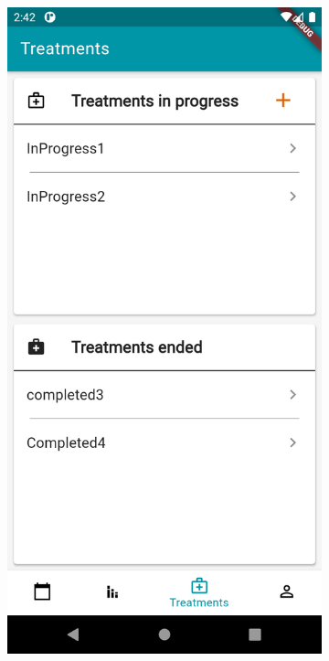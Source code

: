 \documentclass [12pt]{article}
\begin{document}
\begin{description}[leftmargin=1cm,rightmargin=1cm]
\item [ 4)Add treatment]
\
\
\
\begin{figure}[h!]
\centering
\hspace*{\fill}
\begin{subfigure}[tl]{0.3\linewidth}
\includegraphics[width=\linewidth]{treatments1.PNG}

\end{subfigure}
\end{figure}
\end{description}
\end{document}

